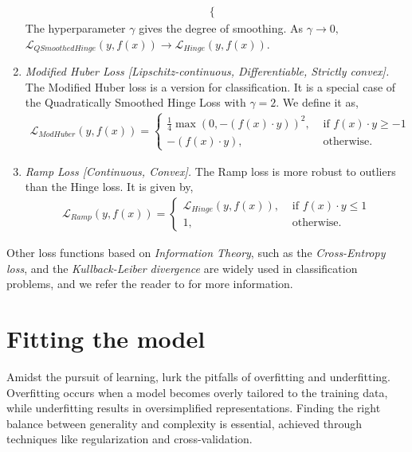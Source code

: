 \documentclass{article}
\begin{document}
\begin{enumerate}
\begin{equation}
\begin{split}
\begin{cases}
        \end{cases}
      \end{split}
    \end{equation}
    The hyperparameter $\gamma$ gives the degree of smoothing. As $\gamma \to 0,$  $\mathcal{L}_{QSmoothedHinge}(y, f(x)) \to \mathcal{L}_{Hinge}(y, f(x)) $.
    \item \textit{Modified Huber Loss [Lipschitz-continuous, Differentiable, Strictly convex].} The Modified Huber loss is a version for classification. It is a special case of the Quadratically Smoothed Hinge Loss with $\gamma =2$. We define it as,
\begin{equation}
      \begin{split}
        \mathcal{L}_{ModHuber}(y, f(x)) = 
        \begin{cases}
          \frac{1}{4} \max (0, -(f(x) \cdot y))^2 , &\text{ if } f(x)\cdot y \geq -1 \\
         -(f(x) \cdot y), &\text{ otherwise.}  
        \end{cases}
      \end{split}
    \end{equation}
    \item \textit{Ramp Loss [Continuous, Convex].} The Ramp loss is more robust to outliers than the Hinge loss. It is given by,
    \begin{equation}
      \begin{split}
        \mathcal{L}_{Ramp}(y, f(x)) = 
        \begin{cases}
         \mathcal{L}_{Hinge}(y, f(x)), &\text{ if } f(x)\cdot y \leq 1 \\
         1, &\text{ otherwise.}  
        \end{cases}
      \end{split}
    \end{equation}
  \end{enumerate}
Other loss functions based on \textit{Information Theory}, such as the \textit{Cross-Entropy loss}, and the \textit{Kullback-Leiber divergence} are widely used in classification problems, and we refer the reader to \citep{ciampiconi2023survey} for more information.
 \section{Fitting the model}

Amidst the pursuit of learning, lurk the pitfalls of overfitting and underfitting. Overfitting occurs when a model becomes overly tailored to the training data, while underfitting results in oversimplified representations. Finding the right balance between generality and complexity is essential, achieved through techniques like regularization and cross-validation.
\end{document}
